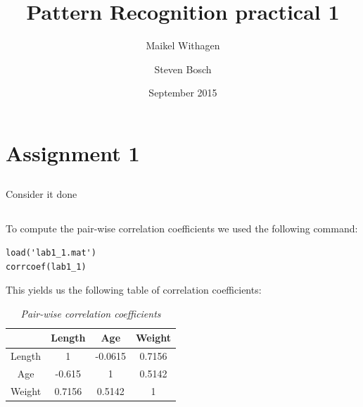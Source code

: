 \documentclass{article}
\title{Pattern Recognition practical 1}
\author{Maikel Withagen \and Steven Bosch}
\date{September 2015}
\begin{document}
\maketitle

\section{Assignment 1}
\subsection{}
Consider it done
\subsection{}
To compute the pair-wise correlation coefficients we used the following command:
\begin{lstlisting}[title= Input]
load('lab1_1.mat')
corrcoef(lab1_1)
\end{lstlisting}
This yields us the following table of correlation coefficients:
\begin{table}[H]
	\caption{\textit{Pair-wise correlation coefficients}}
	\vspace{0.1cm}
	\centering
	\begin{tabular}{|c|c|c|c|}
		\hline
		& Length & Age & Weight \\
		\hline
		Length & 1 & -0.0615 & 0.7156 \\
		\hline
		Age & -0.615 & 1 & 0.5142 \\
		\hline
		Weight & 0.7156 & 0.5142 & 1 \\ 
		\hline
	\end{tabular}
	\label{tab1.2}
\end{table}

\subsection{}
\end{document}
